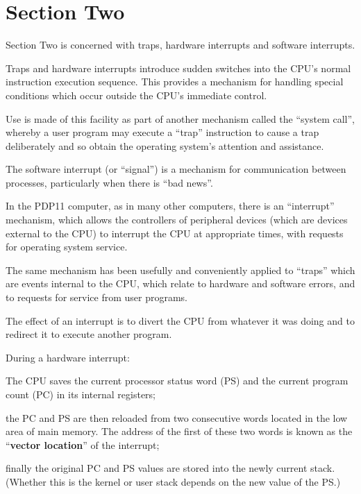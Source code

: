 %
%
\section*{Section Two}

{\sf Section Two is concerned with traps,
hardware interrupts and software interrupts.

Traps and hardware interrupts introduce
sudden switches into the CPU's normal
instruction execution sequence. This
provides a mechanism for handling special conditions which occur outside the
CPU's immediate control.

Use is made of this facility as part of
another mechanism called the ``system
call'', whereby a user program may execute a ``trap'' instruction to cause a
trap deliberately and so obtain the
operating system's attention and assistance.

The software interrupt (or ``signal'') is
a mechanism for communication between
processes, particularly when there is
``bad news''.}


In the PDP11 computer, as in many other
computers, there is an ``interrupt''
mechanism, which allows the controllers
of peripheral devices (which are devices external to the CPU) to interrupt
the CPU at appropriate times, with
requests for operating system service.


The same mechanism has been usefully
and conveniently applied to ``traps''
which are events internal to the CPU,
which relate to hardware and software
errors, and to requests for service
from user programs.


The effect of an interrupt is to divert
the CPU from whatever it was doing and
to redirect it to execute another program.

During a hardware interrupt:

\bi
\item The CPU saves the current processor
 status word (PS) and the current
 program count (PC) in its internal registers;

\item the PC and PS are then reloaded from
 two consecutive words located in
 the low area of main memory. The
 address of the first of these
 two words is known as the
 ``{\bf vector location}'' of the interrupt;

\item finally the original PC and PS values
 are stored into the newly
 current stack. (Whether this is
 the kernel or user stack depends
 on the new value of the PS.)
\ei


